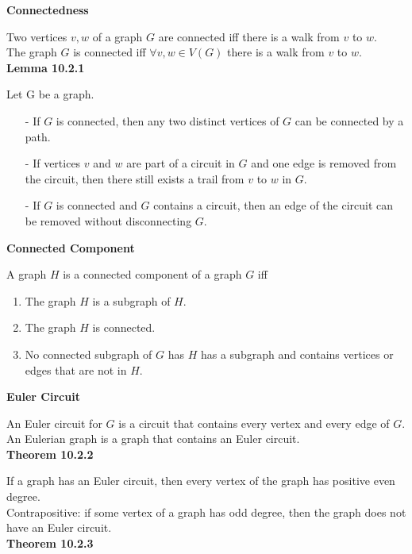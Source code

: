 \documentclass[a4paper]{article}
\newcommand{\subheading}[1]{{\scriptsize\textbf{#1}}}
\begin{document}
\begin{multicols*}{4}
\subheading{Connectedness}

Two vertices $v, w$ of a graph $G$ are connected iff there is a walk from $v$ to
$w$.\\

The graph $G$ is connected iff $\forall v, w \in V(G)$ there is a walk from $v$
to $w$. \\

\subheading{Lemma 10.2.1}

Let G be a graph.
\begin{itemize}[leftmargin=*] \itemsep -0.5em
  \item[-] If $G$ is connected, then any two distinct vertices of $G$ can be
    connected by a path.
  \item[-] If vertices $v$ and $w$ are part of a circuit in $G$ and one edge is
    removed from the circuit, then there still exists a trail from $v$ to $w$ in
    $G$.
  \item[-] If $G$ is connected and $G$ contains a circuit, then an edge of the
    circuit can be removed without disconnecting $G$.
\end{itemize}

\subheading{Connected Component}

A graph $H$ is a connected component of a graph $G$ iff
\begin{enumerate} \itemsep -0.5em
 \item The graph $H$ is a subgraph of $H$.
 \item The graph $H$ is connected.
 \item No connected subgraph of $G$ has $H$ has a subgraph and contains
   vertices or edges that are not in $H$.
\end{enumerate}

\subheading{Euler Circuit}

An Euler circuit for $G$ is a circuit that contains every vertex and every edge
of $G$. An Eulerian graph is a graph that contains an Euler circuit.\\

\subheading{Theorem 10.2.2}

If a graph has an Euler circuit, then every vertex of the graph has positive
even degree.\\

Contrapositive: if some vertex of a graph has odd degree, then the
graph does not have an Euler circuit.\\

\subheading{Theorem 10.2.3}


\end{multicols*}
\end{document}
